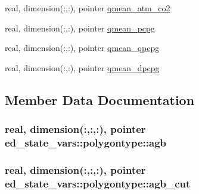 \begin{DoxyCompactItemize}
\item 
real, dimension(\+:,\+:), pointer \hyperlink{structed__state__vars_1_1polygontype_af650ccb9313dcbb1243b54c70d8a271c}{qmean\+\_\+atm\+\_\+co2}
\item 
real, dimension(\+:,\+:), pointer \hyperlink{structed__state__vars_1_1polygontype_a6acc612d279abc9ca1e3f286bde074ff}{qmean\+\_\+pcpg}
\item 
real, dimension(\+:,\+:), pointer \hyperlink{structed__state__vars_1_1polygontype_ab8cdc8aad6e656cc84c8e10642d24e07}{qmean\+\_\+qpcpg}
\item 
real, dimension(\+:,\+:), pointer \hyperlink{structed__state__vars_1_1polygontype_a78d53ba9b2c04cea5f9b562edf5b9499}{qmean\+\_\+dpcpg}
\end{DoxyCompactItemize}


\subsection{Member Data Documentation}
\subsubsection[{\texorpdfstring{agb}{agb}}]{\setlength{\rightskip}{0pt plus 5cm}real, dimension(\+:,\+:,\+:), pointer ed\+\_\+state\+\_\+vars\+::polygontype\+::agb}\hypertarget{structed__state__vars_1_1polygontype_ae956704544a7eceb2ba446d62a2aa760}{}\label{structed__state__vars_1_1polygontype_ae956704544a7eceb2ba446d62a2aa760}
\subsubsection[{\texorpdfstring{agb\+\_\+cut}{agb_cut}}]{\setlength{\rightskip}{0pt plus 5cm}real, dimension(\+:,\+:,\+:), pointer ed\+\_\+state\+\_\+vars\+::polygontype\+::agb\+\_\+cut}\hypertarget{structed__state__vars_1_1polygontype_af1a7e6b13b6be14be176e2731cab99fa}{}\label{structed__state__vars_1_1polygontype_af1a7e6b13b6be14be176e2731cab99fa}
